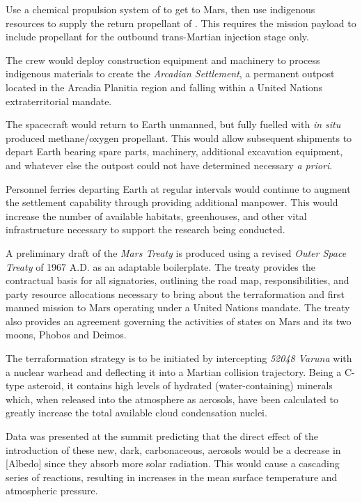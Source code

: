 \item Use a chemical propulsion system of  to get to Mars, then use indigenous resources to supply the return propellant of . This requires the mission payload to include propellant for the outbound trans-Martian injection stage only.

\item The crew would deploy construction equipment and machinery to process indigenous materials to create the {\it Arcadian Settlement}, a permanent outpost located in the Arcadia Planitia region and falling within a United Nations extraterritorial mandate.

\item The spacecraft would return to Earth unmanned, but fully fuelled with {\it in situ} produced methane/oxygen propellant. This would allow subsequent shipments to depart Earth bearing spare parts, machinery, additional excavation equipment, and whatever else the outpost could not have determined necessary {\it a priori}.

\item Personnel ferries departing Earth at regular intervals would continue to augment the settlement capability through providing additional manpower. This would increase the number of available habitats, greenhouses, and other vital infrastructure necessary to support the research being conducted.
\stopitemize

A preliminary draft of the {\it Mars Treaty} is produced using a revised {\it Outer Space Treaty} of 1967 A.D. as an adaptable boilerplate. The treaty provides the contractual basis for all signatories, outlining the road map, responsibilities, and party resource allocations necessary to bring about the terraformation and first manned mission to Mars operating under a United Nations mandate. The treaty also provides an agreement governing the activities of states on Mars and its two moons, Phobos and Deimos.

The terraformation strategy is to be initiated by intercepting {\it 52048 Varuna} with a nuclear warhead and deflecting it into a Martian collision trajectory. Being a C-type asteroid, it contains high levels of hydrated (water-containing) minerals which, when released into the atmosphere as aerosols, have been calculated to greatly increase the total available cloud condensation nuclei.

Data was presented at the summit predicting that the direct effect of the introduction of these new, dark, carbonaceous, aerosols would be a decrease in [Albedo] since they absorb more solar radiation. This would cause a cascading series of reactions, resulting in increases in the mean surface temperature and atmospheric pressure.

